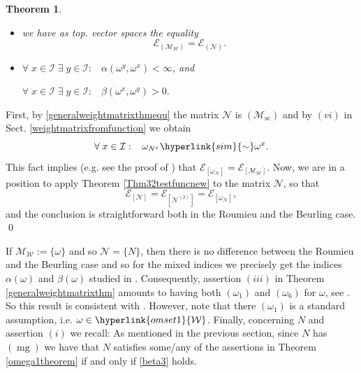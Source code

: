 \documentclass[10pt]{amsart}%
\numberwithin{equation}{section}
\theoremstyle{plain}
\newtheorem{theorem}[proposition]{Theorem}
\let\on=\operatorname
\begin{document}
\begin{theorem}
\begin{itemize}
\begin{itemize}
\item[$(ii)$] we have as top. vector spaces the equality
$$\mathcal{E}_{(\mathcal{M}_{\mathcal{W}})}=\mathcal{E}_{(\mathcal{N})}.$$


\item[$(iii)$]
$\forall\;x\in\mathcal{I}\;\exists\;y\in\mathcal{I}:\;\;\; \alpha(\omega^{y},\omega^{x})<\infty$, and\par
$\forall\;x\in\mathcal{I}\;\exists\;y\in\mathcal{I}:\;\;\;\beta(\omega^{x},\omega^{y})>0.$

\end{itemize}

\end{itemize}
\end{theorem}


First, by \eqref{generalweightmatrixthmequ} the matrix $\mathcal{N}$ is \hyperlink{Msc}{$(\mathcal{M}_{\on{sc}})$} and by $(vi)$ in Sect. \ref{weightmatrixfromfunction} we obtain
\begin{equation}\label{weighfctthmequ}
\forall\;x\in\mathcal{I}:\;\;\;\omega_{N^x}\hyperlink{sim}{\sim}\omega^x.
\end{equation}
This fact implies (e.g. see the proof of \cite[Lemma 5.16 $(1)$]{compositionpaper}) that $\mathcal{E}_{[\omega_{\mathcal{N}}]}=\mathcal{E}_{[\mathcal{M}_{\mathcal{W}}]}$. Now, we are in a position to apply Theorem \ref{Thm32testfuncnew} to the matrix $\mathcal{N}$, so that
$$\mathcal{E}_{[\mathcal{N}]}=\mathcal{E}_{[\mathcal{N}^{(2)}]}=\mathcal{E}_{[\omega_{\mathcal{N}}]},$$
and the conclusion is straightforward both in the Roumieu and the Beurling case.
\qed\enddemo

If $\mathcal{M}_{\mathcal{W}}:=\{\omega\}$ and so $\mathcal{N}=\{N\}$, then there is no difference between the Roumieu and the Beurling case and so for the mixed indices we precisely get the indices $\alpha(\omega)$ and $\beta(\omega)$ studied in \cite{index}. Consequently, assertion $(iii)$ in Theorem \ref{generalweightmatrixthm} amounts to having both \hyperlink{om1}{$(\omega_1)$} and \hyperlink{om6}{$(\omega_6)$} for $\omega$, see \cite[Cor. 2.14, Cor. 2.17]{index}. So this result is consistent with \cite[Cor. 16]{BonetMeiseMelikhov07}. However, note that there \hyperlink{om1}{$(\omega_1)$} is a standard assumption, i.e. $\omega\in\hyperlink{omset1}{\mathcal{W}}$. Finally, concerning $N$ and assertion $(i)$ we recall: As mentioned in the previous section, since $N$ has \hyperlink{mg}{$(\on{mg})$} we have that $N$ satisfies some/any of the assertions in Theorem \ref{omega1theorem} if and only if \eqref{beta3} holds.
\end{document}
